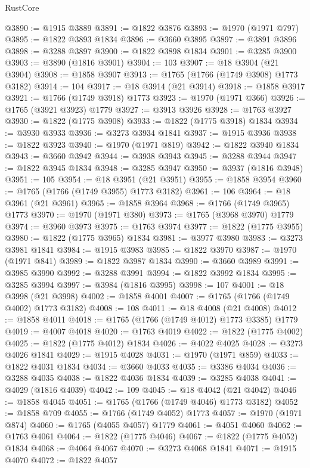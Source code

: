 \begin{lexlean}{RustCore}
\begin{coremodule}
@3890 := @1915 @3889
@3891 := @1822 @3876
@3893 := @1970 (@1971 @797)
@3895 := @1822 @3893 @1834
@3896 := @3660 @3895
@3897 := @3891 @3896
@3898 := @3288 @3897
@3900 := @1822 @3898 @1834
@3901 := @3285 @3900
@3903 := @3890 (@1816 @3901)
@3904 := 103
@3907 := @18 @3904 (@21 @3904)
@3908 := @1858 @3907
@3913 := @1765 (@1766 (@1749 @3908) @1773 @3182)
@3914 := 104
@3917 := @18 @3914 (@21 @3914)
@3918 := @1858 @3917
@3921 := @1766 (@1749 @3918) @1773
@3923 := @1970 (@1971 @366)
@3926 := @1765 (@3921 @3923) @1779
@3927 := @3913 @3926
@3928 := @1763 @3927
@3930 := @1822 (@1775 @3908)
@3933 := @1822 (@1775 @3918) @1834
@3934 := @3930 @3933
@3936 := @3273 @3934 @1841
@3937 := @1915 @3936
@3938 := @1822 @3923
@3940 := @1970 (@1971 @819)
@3942 := @1822 @3940 @1834
@3943 := @3660 @3942
@3944 := @3938 @3943
@3945 := @3288 @3944
@3947 := @1822 @3945 @1834
@3948 := @3285 @3947
@3950 := @3937 (@1816 @3948)
@3951 := 105
@3954 := @18 @3951 (@21 @3951)
@3955 := @1858 @3954
@3960 := @1765 (@1766 (@1749 @3955) @1773 @3182)
@3961 := 106
@3964 := @18 @3961 (@21 @3961)
@3965 := @1858 @3964
@3968 := @1766 (@1749 @3965) @1773
@3970 := @1970 (@1971 @380)
@3973 := @1765 (@3968 @3970) @1779
@3974 := @3960 @3973
@3975 := @1763 @3974
@3977 := @1822 (@1775 @3955)
@3980 := @1822 (@1775 @3965) @1834
@3981 := @3977 @3980
@3983 := @3273 @3981 @1841
@3984 := @1915 @3983
@3985 := @1822 @3970
@3987 := @1970 (@1971 @841)
@3989 := @1822 @3987 @1834
@3990 := @3660 @3989
@3991 := @3985 @3990
@3992 := @3288 @3991
@3994 := @1822 @3992 @1834
@3995 := @3285 @3994
@3997 := @3984 (@1816 @3995)
@3998 := 107
@4001 := @18 @3998 (@21 @3998)
@4002 := @1858 @4001
@4007 := @1765 (@1766 (@1749 @4002) @1773 @3182)
@4008 := 108
@4011 := @18 @4008 (@21 @4008)
@4012 := @1858 @4011
@4018 := @1765 (@1766 (@1749 @4012) @1773 @3385) @1779
@4019 := @4007 @4018
@4020 := @1763 @4019
@4022 := @1822 (@1775 @4002)
@4025 := @1822 (@1775 @4012) @1834
@4026 := @4022 @4025
@4028 := @3273 @4026 @1841
@4029 := @1915 @4028
@4031 := @1970 (@1971 @859)
@4033 := @1822 @4031 @1834
@4034 := @3660 @4033
@4035 := @3386 @4034
@4036 := @3288 @4035
@4038 := @1822 @4036 @1834
@4039 := @3285 @4038
@4041 := @4029 (@1816 @4039)
@4042 := 109
@4045 := @18 @4042 (@21 @4042)
@4046 := @1858 @4045
@4051 := @1765 (@1766 (@1749 @4046) @1773 @3182)
@4052 := @1858 @709
@4055 := @1766 (@1749 @4052) @1773
@4057 := @1970 (@1971 @874)
@4060 := @1765 (@4055 @4057) @1779
@4061 := @4051 @4060
@4062 := @1763 @4061
@4064 := @1822 (@1775 @4046)
@4067 := @1822 (@1775 @4052) @1834
@4068 := @4064 @4067
@4070 := @3273 @4068 @1841
@4071 := @1915 @4070
@4072 := @1822 @4057

\end{coremodule}
\end{lexlean}

